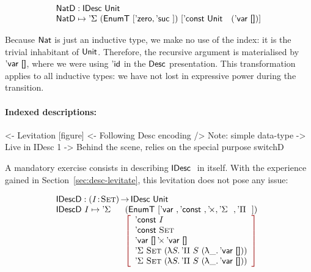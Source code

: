 \[\stk{
\NatD : \IDesc{\Unit} \\
\NatD \mapsto \DSigma{(\EnumT{[ \NatZero, \NatSuc{} ]})}
                     {[ \DConst{\Unit} \quad (\DVar{\Void}) ]}
}\]

Because $\Nat$ is just an inductive type, we make no use of the index:
it is the trivial inhabitant of $\Unit$. Therefore, the recursive
argument is materialised by $\DVar{\Void}$, where we were using $\DId$
in the $\Desc$ presentation. This transformation applies to all
inductive types: we have not lost in expressive power during the
transition.

\paragraph{Indexed descriptions:}

\begin{wstructure}
<- Levitation [figure]
    <- Following Desc encoding
        /> Note: simple data-type
            -> Live in IDesc 1
    -> Behind the scene, relies on the special purpose switchD
\end{wstructure}

A mandatory exercise consists in describing $\IDesc$ in itself. With
the experience gained in Section~\ref{sec:desc-levitate}, this
levitation does not pose any issue:

\[\stk{
\IDescD : \PI{\V{I}}{\Set} \IDesc{\Unit} \\
\begin{array}{@{}ll}
\IDescD~I \mapsto \DSigma{}{} & (\EnumT \red{[} \DVar{},
                                          \DConst{},
                                          \DProd{}{},
                                          \DSigma{}{}, 
                                          \DPi{}{} \red{]}) \\
                              & \bigRedBracket{\begin{array}{l}
                                      \DConst{I}                  \\
                                      \DConst{\Set}               \\
                                      \DProd{\DVar{\Void}}{\DVar{\Void}}  \\
                                      \DSigma{\Set}{(\LAM{S} \DPi{S}{(\LAM{\_} \DVar{\Void})})} \\
                                      \DSigma{\Set}{(\LAM{S} \DPi{S}{(\LAM{\_} \DVar{\Void})})}
                                   \end{array}
                             }
\end{array}
}\]

